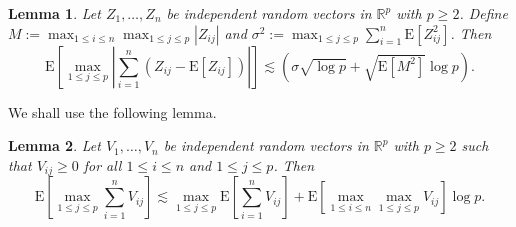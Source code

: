\documentclass[11pt,reqno]{amsart}
\newtheorem{lemma}{Lemma}
\theoremstyle{definition}
\newcommand{\Ep}{{\mathrm{E}}}
\newcommand{\RR}{\mathbb{R}}
\begin{document}
\begin{lemma}
\label{lem: maximal ineq}
Let $Z_{1},\dots,Z_{n}$ be independent random vectors in $\RR^{p}$ with $p \geq 2$. Define $M := \max_{1 \leq i \leq n} \max_{1 \leq j \leq p} | Z_{ij} |$ and $\sigma^{2} := \max_{1 \leq j \leq p} \sum_{i=1}^{n} \Ep [ Z_{ij}^{2} ]$.
Then
\begin{equation*}
\Ep [\max_{1 \leq j \leq p} | {\textstyle \sum}_{i=1}^{n} (Z_{ij} - \Ep [Z_{ij}]) | ] \lesssim (\sigma \sqrt{\log p} + \sqrt{\Ep [ M^{2} ]} \log p).
\end{equation*}
\end{lemma}

We shall use the following lemma.

\begin{lemma}
\label{lem: maximal ineq nonnegative}
Let $V_{1},\dots,V_{n}$ be independent random vectors in $\RR^{p}$ with $p \geq 2$ such that $V_{ij} \geq 0$ for all $1 \leq i \leq n$ and $1 \leq j \leq p$. Then
\begin{equation*}
\Ep [ \max_{1 \leq j \leq p} {\textstyle \sum}_{i=1}^{n} V_{ij} ] \lesssim \max_{1 \leq j \leq p} \Ep [ {\textstyle \sum}_{i=1}^{n} V_{ij} ] + \Ep [ \max_{1 \leq i \leq n} \max_{1 \leq j \leq p} V_{ij} ] \log p.
\end{equation*}
\end{lemma}
\end{document}
